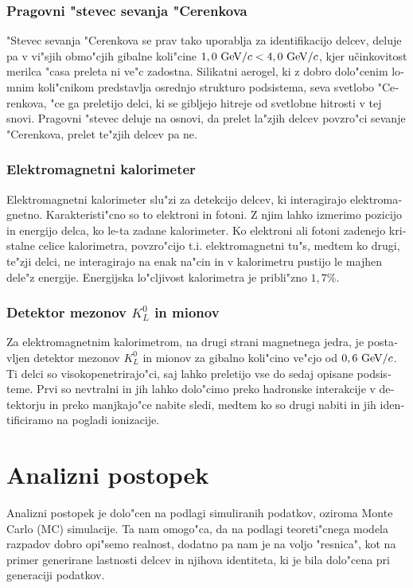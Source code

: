 \begin{otherlanguage}{slovene}
\subsubsection{Pragovni "stevec sevanja "Cerenkova}
"Stevec sevanja "Cerenkova se prav tako uporablja za identifikacijo delcev, deluje pa v vi"sjih obmo"cjih gibalne koli"cine $1,0\mathrm{~GeV}/c < 4,0\mathrm{~GeV}/c$, kjer učinkovitost merilca "casa preleta ni ve"c zadostna. Silikatni aerogel, ki z dobro dolo"cenim lomnim koli"cnikom predstavlja osrednjo strukturo podsistema, seva svetlobo "Cerenkova, "ce ga preletijo delci, ki se gibljejo hitreje od svetlobne hitrosti v tej snovi. Pragovni "stevec deluje na osnovi, da prelet la"zjih delcev povzro"ci sevanje "Cerenkova, prelet te"zjih delcev pa ne.

\subsubsection{Elektromagnetni kalorimeter}
Elektromagnetni kalorimeter slu"zi za detekcijo delcev, ki interagirajo elektromagnetno. Karakteristi"cno so to elektroni in fotoni. Z njim lahko izmerimo pozicijo in energijo delca, ko le-ta zadane kalorimeter. Ko elektroni ali fotoni zadenejo kristalne celice kalorimetra, povzro"cijo t.i. elektromagnetni tu"s, medtem ko drugi, te"zji delci, ne interagirajo na enak na"cin in v kalorimetru pustijo le majhen dele"z energije. Energijska lo"cljivost kalorimetra je pribli"zno $1,7\%$.

\subsubsection{Detektor mezonov $K_L^0$ in mionov}
Za elektromagnetnim kalorimetrom, na drugi strani magnetnega jedra, je postavljen detektor mezonov $K_L^0$ in mionov za gibalno koli"cino ve"cjo od $0,6\mathrm{~GeV}/c$. Ti delci so visokopenetrirajo"ci, saj lahko preletijo vse do sedaj opisane podsisteme. Prvi so nevtralni in jih lahko dolo"cimo preko hadronske interakcije v detektorju in preko manjkajo"ce nabite sledi, medtem ko so drugi nabiti in jih identificiramo na pogladi ionizacije.

\section{Analizni postopek}
Analizni postopek je dolo"cen na podlagi simuliranih podatkov, oziroma Monte Carlo (MC) simulacije. Ta nam omogo"ca, da na podlagi teoreti"cnega modela razpadov dobro opi"semo realnost, dodatno pa nam je na voljo "resnica", kot na primer generirane lastnosti delcev in njihova identiteta, ki je bila dolo"cena pri generaciji podatkov.


\end{otherlanguage}
